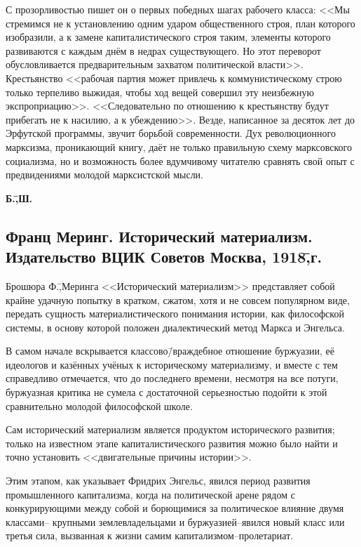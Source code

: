 С прозорливостью пишет он о первых победных шагах рабочего класса: <<Мы стремимся не к установлению одним ударом общественного строя, план которого изобразили, а к замене капиталистического строя таким, элементы которого развиваются с каждым днём в недрах существующего. Но этот переворот обусловливается предварительным захватом политической власти>>. Крестьянство <<рабочая партия может привлечь к коммунистическому строю только терпеливо выжидая, чтобы ход вещей совершил эту неизбежную экспроприацию>>. <<Следовательно по отношению к крестьянству будут прибегать не к насилию, а к убеждению>>. Везде, написанное за десяток лет до Эрфутской программы, звучит борьбой современности. Дух революционного марксизма, проникающий книгу, даёт не только правильную схему марксовского социализма, но и возможность более вдумчивому читателю сравнять свой опыт с предвидениями молодой марксистской мысли.

\begin{flushright}
 \textbf{Б.\=,Ш.}\hspace*{2em}
\end{flushright}

\subsection*{Франц Меринг. Исторический материализм. Издательство ВЦИК Советов Москва, 1918\=,г.}
\label{subsec:10.5}

Брошюра Ф.\=,Меринга <<Исторический материализм>> представляет собой крайне удачную попытку в кратком, сжатом, хотя и не совсем популярном виде, передать сущность материалистического понимания истории, как философской системы, в основу которой положен диалектический метод Маркса и Энгельса.

В самом начале вскрывается классово\=/враждебное отношение буржуазии, её идеологов и казённых учёных к историческому материализму, и вместе с тем справедливо отмечается, что до последнего времени, несмотря на все потуги, буржуазная критика не сумела с достаточной серьезностью подойти к этой сравнительно молодой философской школе.

Сам исторический материализм является продуктом исторического развития; только на известном этапе капиталистического развития можно было найти и точно установить <<двигательные причины истории>>.

Этим этапом, как указывает Фридрих Энгельс, явился период развития промышленного капитализма, когда на политической арене рядом с конкурирующими между собой и борющимися за политическое влияние двумя классами\--- крупными землевладельцами и буржуазией\---явился новый класс или третья сила, вызванная к жизни самим капитализмом\---пролетариат.

